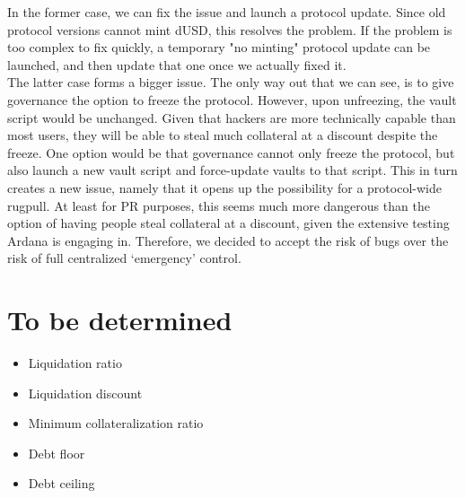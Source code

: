 \documentclass{article} %
\begin{document}
In the former case, we can fix the issue and launch a protocol update. Since old
protocol versions cannot mint dUSD, this resolves the problem.
If the problem is too complex to fix quickly, a temporary "no minting" protocol
update can be launched, and then update that one once we actually fixed it. \\

The latter case forms a bigger issue.
The only way out that we can see, is to give governance the option to freeze the
protocol.
However, upon unfreezing, the vault script would be unchanged.
Given that hackers are more technically capable than most users, they will be
able to steal much collateral at a discount despite the freeze.
One option would be that governance cannot only freeze the protocol, but also
launch a new vault script and force-update vaults to that script.
This in turn creates a new issue, namely that it opens up the possibility for a
protocol-wide rugpull.
At least for PR purposes, this seems much more dangerous than the option of
having people steal collateral at a discount, given the extensive testing Ardana
is engaging in.
Therefore, we decided to accept the risk of bugs over the risk of full
centralized `emergency' control.

\section{To be determined}

\begin{itemize}
  \item Liquidation ratio
  \item Liquidation discount
  \item Minimum collateralization ratio
  \item Debt floor
  \item Debt ceiling
\end{itemize}
\end{document}
